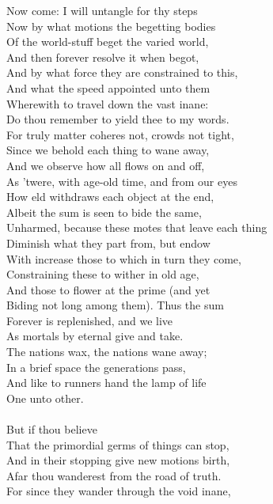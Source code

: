 Now come: I will untangle for thy steps\\
Now by what motions the begetting bodies\\
Of the world-stuff beget the varied world,\\
And then forever resolve it when begot,\\
And by what force they are constrained to this,\\
And what the speed appointed unto them\\
Wherewith to travel down the vast inane:\\
Do thou remember to yield thee to my words.\\
For truly matter coheres not, crowds not tight,\\
Since we behold each thing to wane away,\\
And we observe how all flows on and off,\\
As 'twere, with age-old time, and from our eyes\\
How eld withdraws each object at the end,\\
Albeit the sum is seen to bide the same,\\
Unharmed, because these motes that leave each thing\\
Diminish what they part from, but endow\\
With increase those to which in turn they come,\\
Constraining these to wither in old age,\\
And those to flower at the prime (and yet\\
Biding not long among them). Thus the sum\\
Forever is replenished, and we live\\
As mortals by eternal give and take.\\
The nations wax, the nations wane away;\\
In a brief space the generations pass,\\
And like to runners hand the lamp of life\\
One unto other.\\
\\
But if thou believe\\
That the primordial germs of things can stop,\\
And in their stopping give new motions birth,\\
Afar thou wanderest from the road of truth.\\
For since they wander through the void inane,\\

